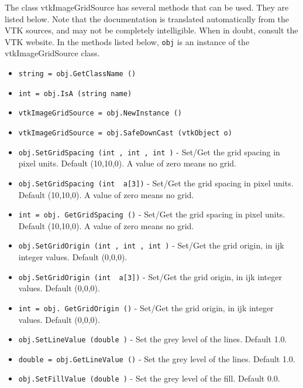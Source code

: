 The class vtkImageGridSource has several methods that can be used.
  They are listed below.
Note that the documentation is translated automatically from the VTK sources,
and may not be completely intelligible.  When in doubt, consult the VTK website.
In the methods listed below, \verb|obj| is an instance of the vtkImageGridSource class.
\begin{itemize}
\item  \verb|string = obj.GetClassName ()|

\item  \verb|int = obj.IsA (string name)|

\item  \verb|vtkImageGridSource = obj.NewInstance ()|

\item  \verb|vtkImageGridSource = obj.SafeDownCast (vtkObject o)|

\item  \verb|obj.SetGridSpacing (int , int , int )| -  Set/Get the grid spacing in pixel units.  Default (10,10,0).
 A value of zero means no grid.

\item  \verb|obj.SetGridSpacing (int  a[3])| -  Set/Get the grid spacing in pixel units.  Default (10,10,0).
 A value of zero means no grid.

\item  \verb|int = obj. GetGridSpacing ()| -  Set/Get the grid spacing in pixel units.  Default (10,10,0).
 A value of zero means no grid.

\item  \verb|obj.SetGridOrigin (int , int , int )| -  Set/Get the grid origin, in ijk integer values.  Default (0,0,0).

\item  \verb|obj.SetGridOrigin (int  a[3])| -  Set/Get the grid origin, in ijk integer values.  Default (0,0,0).

\item  \verb|int = obj. GetGridOrigin ()| -  Set/Get the grid origin, in ijk integer values.  Default (0,0,0).

\item  \verb|obj.SetLineValue (double )| -  Set the grey level of the lines. Default 1.0.

\item  \verb|double = obj.GetLineValue ()| -  Set the grey level of the lines. Default 1.0.

\item  \verb|obj.SetFillValue (double )| -  Set the grey level of the fill. Default 0.0.


\end{itemize}
